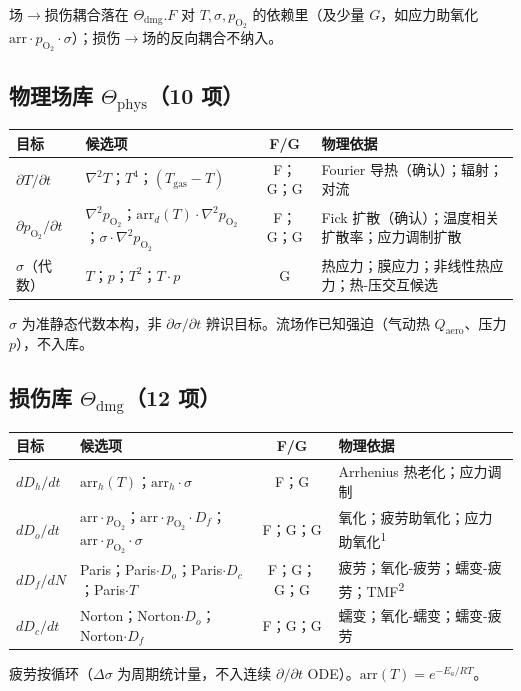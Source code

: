 \documentclass[11pt,a4paper]{article}
\begin{document}
\noindent 场$\to$损伤耦合落在 $\Theta_{\mathrm{dmg}}.F$ 对 $T,\sigma,p_{\mathrm{O}_2}$ 的依赖里（及少量 $G$，如应力助氧化 $\mathrm{arr}\cdot p_{\mathrm{O}_2}\cdot\sigma$）；损伤$\to$场的反向耦合不纳入。

\subsection{物理场库 $\Theta_{\mathrm{phys}}$（10 项）}
\begin{table}[h]\centering\small
\begin{tabular}{>{\raggedright\arraybackslash}p{2.6cm} >{\raggedright\arraybackslash}p{4.6cm} c >{\raggedright\arraybackslash}p{5.2cm}}
\toprule
目标 & 候选项 & F/G & 物理依据 \\
\midrule
$\partial T/\partial t$ & $\nabla^2 T$；$T^4$；$(T_{\mathrm{gas}}-T)$ & F；G；G & Fourier 导热（确认）；辐射；对流 \\
$\partial p_{\mathrm{O}_2}/\partial t$ & $\nabla^2 p_{\mathrm{O}_2}$；$\mathrm{arr}_d(T)\!\cdot\!\nabla^2 p_{\mathrm{O}_2}$；$\sigma\!\cdot\!\nabla^2 p_{\mathrm{O}_2}$ & F；G；G & Fick 扩散（确认）；温度相关扩散率；应力调制扩散 \\
$\sigma$（代数） & $T$；$p$；$T^2$；$T\!\cdot\! p$ & G & 热应力；膜应力；非线性热应力；热-压交互候选 \\
\bottomrule
\end{tabular}
\end{table}
$\sigma$ 为准静态代数本构，非 $\partial\sigma/\partial t$ 辨识目标。流场作已知强迫（气动热 $Q_{\mathrm{aero}}$、压力 $p$），不入库。

\subsection{损伤库 $\Theta_{\mathrm{dmg}}$（12 项）}
\begin{table}[h]\centering\small
\begin{tabular}{>{\raggedright\arraybackslash}p{2.4cm} >{\raggedright\arraybackslash}p{7cm} c >{\raggedright\arraybackslash}p{3.4cm}}
\toprule
目标 & 候选项 & F/G & 物理依据 \\
\midrule
$dD_h/dt$ & $\mathrm{arr}_h(T)$；$\mathrm{arr}_h\!\cdot\!\sigma$ & F；G & Arrhenius 热老化；应力调制 \\
$dD_o/dt$ & $\mathrm{arr}\!\cdot\! p_{\mathrm{O}_2}$；$\mathrm{arr}\!\cdot\! p_{\mathrm{O}_2}\!\cdot\! D_f$；$\mathrm{arr}\!\cdot\! p_{\mathrm{O}_2}\!\cdot\!\sigma$ & F；G；G & 氧化；疲劳助氧化；应力助氧化\textsuperscript{1} \\
$dD_f/dN$ & Paris；Paris$\cdot D_o$；Paris$\cdot D_c$；Paris$\cdot T$ & F；G；G；G & 疲劳；氧化-疲劳；蠕变-疲劳；TMF\textsuperscript{2} \\
$dD_c/dt$ & Norton；Norton$\cdot D_o$；Norton$\cdot D_f$ & F；G；G & 蠕变；氧化-蠕变；蠕变-疲劳 \\
\bottomrule
\end{tabular}
\end{table}
疲劳按循环（$\Delta\sigma$ 为周期统计量，不入连续 $\partial/\partial t$ ODE）。$\mathrm{arr}(T)=e^{-E_a/RT}$。
\end{document}
